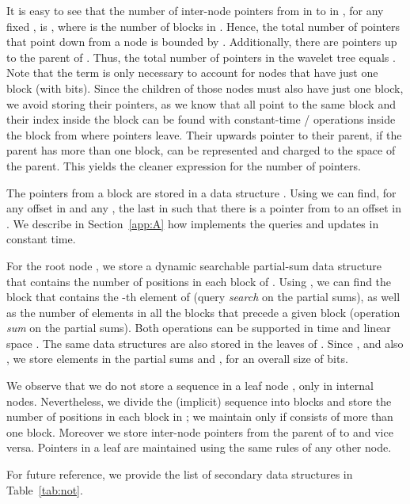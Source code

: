 \documentclass[11pt]{article}
\begin{document}
It is easy to see that the number of inter-node pointers from  in  
to  in , for any fixed , is , where  is the number of blocks 
in . Hence, the total number of pointers that point down from a node 
 is bounded by . Additionally, there are  pointers 
up to the parent of . Thus, the total number of pointers 
in the wavelet tree equals . Note that the term
 is only necessary to account for nodes that have just
one block (with  bits). Since the children of those nodes
must also have just one block, we avoid storing their pointers, as we know that
all point to the same block and their index inside the block can be found with
constant-time / operations inside the block from where pointers 
leave. Their upwards pointer to their parent, if the parent has more than one
block, can be represented and charged to the space of the parent. 
This yields the cleaner expression
 for the number of pointers.

The pointers from a block  are stored in a data structure . Using  we can find, for any 
offset  in  and any , the last 
 in  such that there is a pointer from  to an 
offset  in .  
We describe in Section~\ref{app:A} how  implements the queries and 
updates in constant time.

For the root node , we store a dynamic searchable partial-sum data 
structure  that contains the number of positions in each block of 
. Using , we can find the block  that contains the 
-th element of  (query {\em search} on the partial sums), as well 
as the number of elements in all the blocks that precede a given block 
 (operation {\em sum} on the partial sums).
Both operations can be supported in  time and linear space
\cite[Lem.~1]{NS10}.
The same data structures 
 are also stored in the leaves  of . 
Since , and also , we store  elements in the partial
sums  and , for an overall size of 
bits.

We observe that we do not store a sequence  in a leaf node
, only in internal nodes. Nevertheless, we divide the (implicit) sequence 
 into blocks and store the  number of positions in each 
block in ; we maintain  only if  consists of more than one block. Moreover we store inter-node pointers from 
the parent of  to  and vice versa.
Pointers in a leaf are maintained using the same rules of any other node.

For future reference, we provide the list of secondary data structures in Table~\ref{tab:not}.
\end{document}
